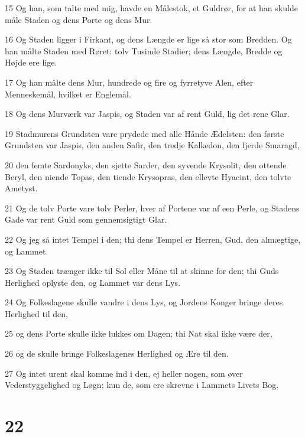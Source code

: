 \par 15 Og han, som talte med mig, havde en Målestok, et Guldrør, for at han skulde måle Staden og dens Porte og dens Mur.
\par 16 Og Staden ligger i Firkant, og dens Længde er lige så stor som Bredden. Og han målte Staden med Røret: tolv Tusinde Stadier; dens Længde, Bredde og Højde ere lige.
\par 17 Og han målte dens Mur, hundrede og fire og fyrretyve Alen, efter Menneskemål, hvilket er Englemål.
\par 18 Og dens Murværk var Jaspis, og Staden var af rent Guld, lig det rene Glar.
\par 19 Stadmurens Grundsten vare prydede med alle Hånde Ædelsten: den første Grundsten var Jaspis, den anden Safir, den tredje Kalkedon, den fjerde Smaragd,
\par 20 den femte Sardonyks, den sjette Sarder, den syvende Krysolit, den ottende Beryl, den niende Topas, den tiende Krysopras, den ellevte Hyacint, den tolvte Ametyst.
\par 21 Og de tolv Porte vare tolv Perler, hver af Portene var af een Perle, og Stadens Gade var rent Guld som gennemsigtigt Glar.
\par 22 Og jeg så intet Tempel i den; thi dens Tempel er Herren, Gud, den almægtige, og Lammet.
\par 23 Og Staden trænger ikke til Sol eller Måne til at skinne for den; thi Guds Herlighed oplyste den, og Lammet var dens Lys.
\par 24 Og Folkeslagene skulle vandre i dens Lys, og Jordens Konger bringe deres Herlighed til den,
\par 25 og dens Porte skulle ikke lukkes om Dagen; thi Nat skal ikke være der,
\par 26 og de skulle bringe Folkeslagenes Herlighed og Ære til den.
\par 27 Og intet urent skal komme ind i den, ej heller nogen, som øver Vederstyggelighed og Løgn; kun de, som ere skrevne i Lammets Livets Bog.

\chapter{22}


